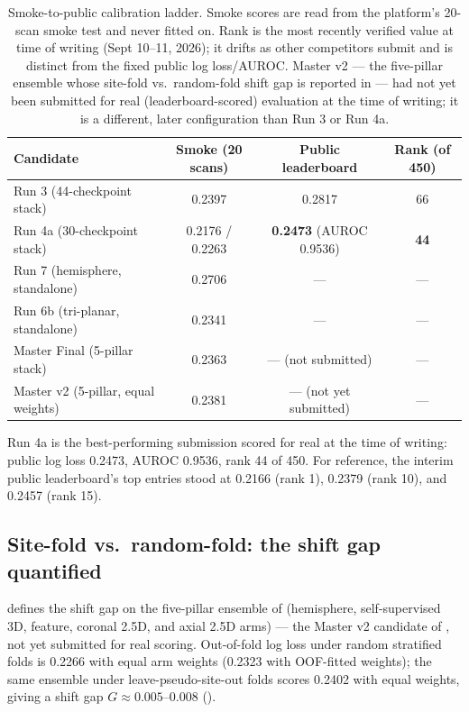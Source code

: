\documentclass[11pt]{article}
\newcommand{\shiftgap}{\ensuremath{G}}
\begin{document}
\begin{table}[t]
\centering
\small
\caption{Smoke-to-public calibration ladder. Smoke scores are read from the platform's 20-scan smoke test and never fitted on. Rank is the most recently verified value at time of writing (Sept 10--11, 2026); it drifts as other competitors submit and is distinct from the fixed public log loss/AUROC. Master v2 --- the five-pillar ensemble whose site-fold vs.\ random-fold shift gap is reported in  --- had not yet been submitted for real (leaderboard-scored) evaluation at the time of writing; it is a different, later configuration than Run 3 or Run 4a.}
\label{tab:ladder}
\begin{tabular}{@{}lccc@{}}
\toprule
\textbf{Candidate} & \textbf{Smoke (20 scans)} & \textbf{Public leaderboard} & \textbf{Rank (of 450)} \\
\midrule
Run 3 (44-checkpoint stack) & 0.2397 & 0.2817 & 66 \\
Run 4a (30-checkpoint stack) & 0.2176 / 0.2263 & \textbf{0.2473} (AUROC 0.9536) & \textbf{44} \\
Run 7 (hemisphere, standalone) & 0.2706 & --- & --- \\
Run 6b (tri-planar, standalone) & 0.2341 & --- & --- \\
Master Final (5-pillar stack) & 0.2363 & --- (not submitted) & --- \\
Master v2 (5-pillar, equal weights) & 0.2381 & --- (not yet submitted) & --- \\
\bottomrule
\end{tabular}
\end{table}

Run 4a is the best-performing submission scored for real at the time of writing: public log loss 0.2473, AUROC 0.9536, rank 44 of 450. For reference, the interim public leaderboard's top entries stood at 0.2166 (rank 1), 0.2379 (rank 10), and 0.2457 (rank 15).

\subsection{Site-fold vs.\ random-fold: the shift gap quantified}
\label{sec:shiftgap-results}

 defines the shift gap on the five-pillar ensemble of  (hemisphere, self-supervised 3D, feature, coronal 2.5D, and axial 2.5D arms) --- the Master v2 candidate of , not yet submitted for real scoring. Out-of-fold log loss under random stratified folds is 0.2266 with equal arm weights (0.2323 with OOF-fitted weights); the same ensemble under leave-pseudo-site-out folds scores 0.2402 with equal weights, giving a shift gap $\shiftgap \approx 0.005$--$0.008$ ().
\end{document}

